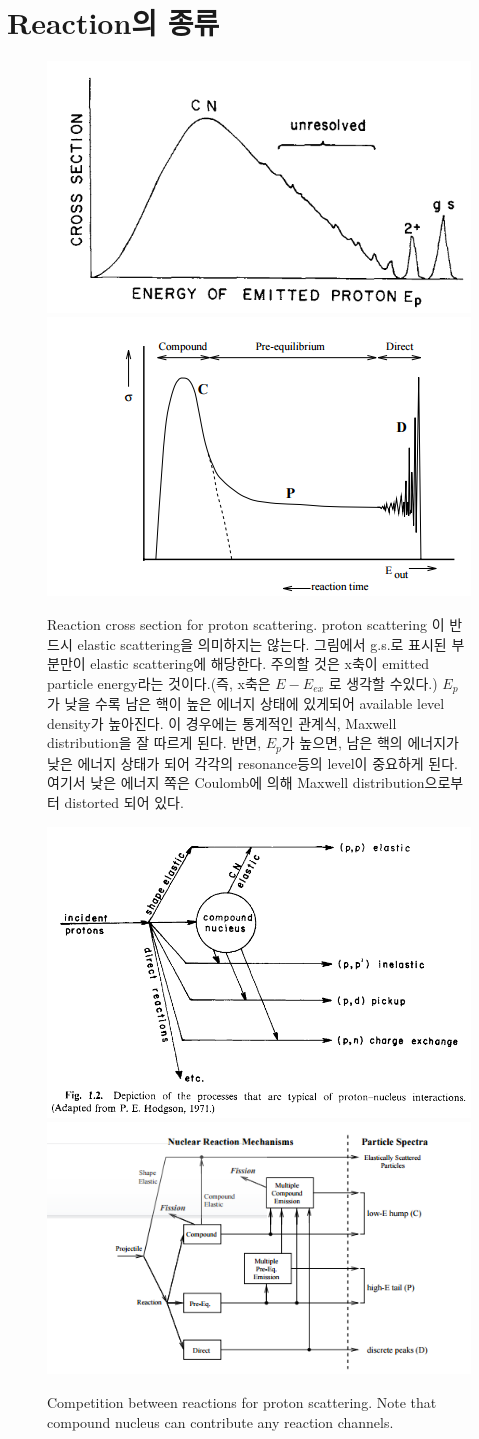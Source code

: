 \documentclass[11pt]{book}
\begin{document}
\section{Reaction의 종류} 
\begin{figure}
\includegraphics[width=0.5\linewidth]{Glend_fig1_1}
\includegraphics[width=0.5\linewidth]{talys_fig3_2}
\caption{Reaction cross section for proton scattering. 
proton scattering 이 반드시 elastic scattering을 의미하지는 않는다. 
그림에서 g.s.로 표시된 부분만이 elastic scattering에 해당한다. 	
주의할 것은 x축이 emitted particle energy라는 것이다.(즉, x축은 $E-E_{ex}$ 로 생각할 수있다.)
$E_p$가 낮을 수록 남은 핵이
높은 에너지 상태에 있게되어 available level density가 높아진다. 이 경우에는 
통계적인 관계식, Maxwell distribution을 잘 따르게 된다. 반면, $E_p$가 높으면,
남은 핵의 에너지가 낮은 에너지 상태가 되어 각각의 resonance등의 level이 중요하게 된다.
여기서 낮은 에너지 쪽은 Coulomb에 의해 Maxwell distribution으로부터 distorted 되어 있다. 
}
\label{fig:Glend_fig1_1}
\end{figure}

\begin{figure}
\includegraphics[width=0.5\linewidth]{Glend_fig1_2}
\includegraphics[width=0.5\linewidth]{talys_fig3_1}
\caption{Competition between reactions for proton scattering.
Note that compound nucleus can contribute any reaction channels. 
}
\label{fig:Glend_fig1_2}
\end{figure}
\end{document}
